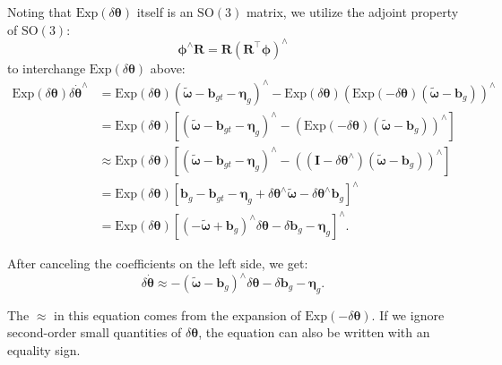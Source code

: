 Noting that $\mathrm{Exp}(\delta \boldsymbol{\theta})$ itself is an $\mathrm{SO}(3)$ matrix, we utilize the adjoint property of $\mathrm{SO}(3)$:
\begin{equation}\label{key}
	\boldsymbol{\phi}^\wedge \bm{R} = \bm{R} (\bm{R}^\top \boldsymbol{\phi})^\wedge
\end{equation}
to interchange $\mathrm{Exp}(\delta \boldsymbol{\theta})$ above:
\begin{equation}\label{key}
	\begin{aligned}
		\mathrm{Exp} (\delta \boldsymbol{\theta}) \delta \dot{\boldsymbol{\theta}}^\wedge &= 
		\mathrm{Exp} (\delta \boldsymbol{\theta}) \left( \tilde{\boldsymbol{\omega}} - \bm{b}_{gt} - 
		\boldsymbol{\eta}_g \right)^\wedge - \mathrm{Exp} (\delta \boldsymbol{\theta})  \left( 
		\mathrm{Exp} (-\delta \boldsymbol{\theta})  (\tilde{\boldsymbol{\omega}}-\bm{b}_g) 
		\right)^\wedge \\
		&=  \mathrm{Exp} (\delta \boldsymbol{\theta}) \left[ (\tilde{\boldsymbol{\omega}} - \bm{b}_{gt} - 
		\boldsymbol{\eta}_g)^\wedge - (\mathrm{Exp} (-\delta \boldsymbol{\theta})  
		(\tilde{\boldsymbol{\omega}}-\bm{b}_g) )^\wedge \right] \\
		&\approx \mathrm{Exp} (\delta \boldsymbol{\theta}) \left[ (\tilde{\boldsymbol{\omega}} - 
		\bm{b}_{gt} - \boldsymbol{\eta}_g)^\wedge - \left((\bm{I} - \delta 
		\boldsymbol{\theta}^\wedge)(\tilde{\boldsymbol{\omega}}-\bm{b}_g )\right)^\wedge \right] \\
		&=  \mathrm{Exp} (\delta \boldsymbol{\theta}) \left[ \bm{b}_g - \bm{b}_{gt} -\boldsymbol{\eta}_g 
		+ \delta \boldsymbol{\theta}^\wedge \tilde{\boldsymbol{\omega}} - \delta 
		\boldsymbol{\theta}^\wedge \bm{b}_{g} \right]^\wedge \\
		&= \mathrm{Exp} (\delta \boldsymbol{\theta}) \left[ 
		(-\tilde{\boldsymbol{\omega}}+\bm{b}_g)^\wedge \delta \boldsymbol{\theta} - \delta \bm{b}_g - 
		\boldsymbol{\eta}_g \right]^\wedge.
	\end{aligned}
\end{equation}

After canceling the coefficients on the left side, we get:
\begin{equation}\label{key}
	\delta \dot{\boldsymbol{\theta}} \approx -(\tilde{\boldsymbol{\omega}} - \bm{b}_g)^\wedge \delta 
	\boldsymbol{\theta} - \delta \bm{b}_g - \boldsymbol{\eta}_g. 
\end{equation}

The $\approx$ in this equation comes from the expansion of $\mathrm{Exp}(-\delta \boldsymbol{\theta})$. If we ignore second-order small quantities of $\delta \boldsymbol{\theta}$, the equation can also be written with an equality sign.

